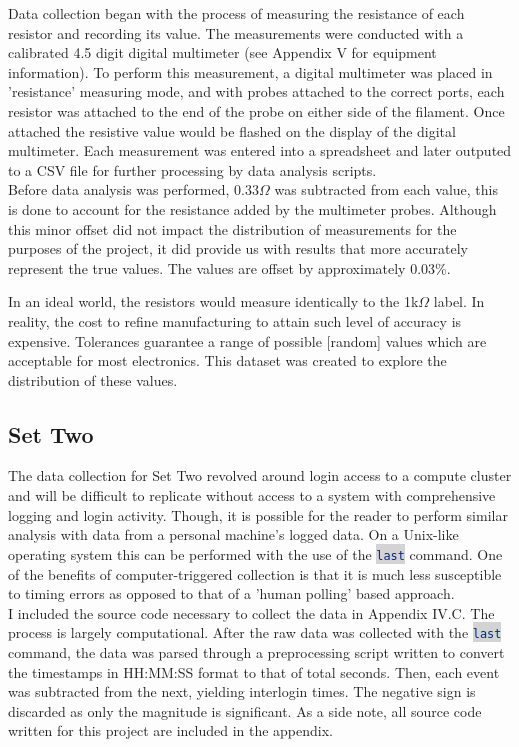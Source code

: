 \documentclass[10pt]{report}
\newcommand{\inlinecode}[2]{\colorbox{lightgray}{\lstinline[language=#1]$#2$}}
\begin{document}
Data collection began with the process of measuring the resistance of each resistor
and recording its value. The measurements were conducted with a calibrated 4.5 digit
digital multimeter (see Appendix V for equipment information). To perform this measurement,
a digital multimeter was placed in 'resistance' measuring mode, and with probes attached to the correct ports, 
each resistor was attached to the end of the probe on either side of the filament. Once attached the resistive value 
would be flashed on the display of the digital multimeter. Each measurement was entered
into a spreadsheet and later outputed to a CSV file for further processing by data analysis scripts. \\
Before data analysis was performed, $0.33\Omega$ was subtracted from each value, this is done to account
for the resistance added by the multimeter probes. Although this minor offset did not impact the
distribution of measurements for the purposes of the project, it did provide us with results that more 
accurately represent the true values. The values are offset by approximately 0.03\%.

In an ideal world, the resistors would measure identically to the 1k$\Omega$ label.
In reality, the cost to refine manufacturing to attain such level of accuracy is expensive.
Tolerances guarantee a range of possible [random] values which are acceptable for most 
electronics. This dataset was created to explore the distribution of these values.

\subsection*{Set Two}
\par
The data collection for Set Two revolved around login access to a compute cluster
and will be difficult to replicate without access to a system with comprehensive logging and login activity.
Though, it is possible for the reader to perform similar analysis with data from a personal machine's logged data. 
On a Unix-like operating system this can be performed with the use of the \inlinecode{Bash}{last} command. 
One of the benefits of computer-triggered collection is that it is much less susceptible to timing errors 
as opposed to that of a 'human polling' based approach. \\ I included the source code necessary to collect 
the data in Appendix IV.C. The process is largely computational. After the raw data was collected with the
\inlinecode{Bash}{last} command, the data was parsed through a preprocessing script written to convert the 
timestamps in HH:MM:SS format to that of total seconds. Then, each event was subtracted from the next, yielding 
interlogin times. The negative sign is discarded as only the magnitude is significant.
As a side note, all source code written for this project are included in the appendix.
\end{document}
